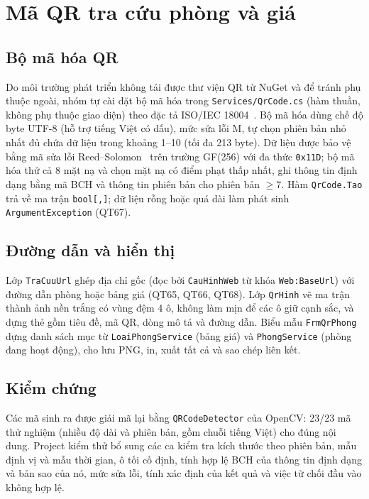 \documentclass[14pt]{report}
\begin{document}
\section{Mã QR tra cứu phòng và giá}

\subsection{Bộ mã hóa QR}
Do môi trường phát triển không tải được thư viện QR từ NuGet và để tránh phụ thuộc ngoài, nhóm tự cài đặt bộ mã hóa trong \texttt{Services/QrCode.cs} (hàm thuần, không phụ thuộc giao diện) theo đặc tả ISO/IEC 18004~\cite{iso18004}. Bộ mã hóa dùng chế độ byte UTF-8 (hỗ trợ tiếng Việt có dấu), mức sửa lỗi M, tự chọn phiên bản nhỏ nhất đủ chứa dữ liệu trong khoảng 1--10 (tối đa 213 byte). Dữ liệu được bảo vệ bằng mã sửa lỗi Reed--Solomon~\cite{reed-solomon} trên trường GF(256) với đa thức \texttt{0x11D}; bộ mã hóa thử cả 8 mặt nạ và chọn mặt nạ có điểm phạt thấp nhất, ghi thông tin định dạng bằng mã BCH và thông tin phiên bản cho phiên bản $\ge 7$. Hàm \texttt{QrCode.Tao} trả về ma trận \texttt{bool[,]}; dữ liệu rỗng hoặc quá dài làm phát sinh \texttt{ArgumentException} (QT67).

\subsection{Đường dẫn và hiển thị}
Lớp \texttt{TraCuuUrl} ghép địa chỉ gốc (đọc bởi \texttt{CauHinhWeb} từ khóa \texttt{Web:BaseUrl}) với đường dẫn phòng hoặc bảng giá (QT65, QT66, QT68). Lớp \texttt{QrHinh} vẽ ma trận thành ảnh nền trắng có vùng đệm 4 ô, không làm mịn để các ô giữ cạnh sắc, và dựng thẻ gồm tiêu đề, mã QR, dòng mô tả và đường dẫn. Biểu mẫu \texttt{FrmQrPhong} dựng danh sách mục từ \texttt{LoaiPhongService} (bảng giá) và \texttt{PhongService} (phòng đang hoạt động), cho lưu PNG, in, xuất tất cả và sao chép liên kết.

\subsection{Kiểm chứng}
Các mã sinh ra được giải mã lại bằng \texttt{QRCodeDetector} của OpenCV: 23/23 mã thử nghiệm (nhiều độ dài và phiên bản, gồm chuỗi tiếng Việt) cho đúng nội dung. Project kiểm thử bổ sung các ca kiểm tra kích thước theo phiên bản, mẫu định vị và mẫu thời gian, ô tối cố định, tính hợp lệ BCH của thông tin định dạng và bản sao của nó, mức sửa lỗi, tính xác định của kết quả và việc từ chối đầu vào không hợp lệ.
\end{document}
